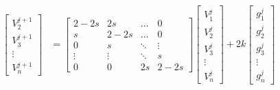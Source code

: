 \begin{align*}
\begin{bmatrix}
    V_2^{j+1} \\
    V_3^{j+1} \\
    \vdots    \\
    V_n^{j+1}
\end{bmatrix}
&=
\begin{bmatrix}
    2-2s   & 2s     & \dots  & 0 \\
    s      & 2-2s   & \dots  & 0 \\
    0      & s      & \ddots & \vdots \\
    \vdots & \vdots & \ddots & s   \\
    0      & 0      & 2s     & 2-2s
\end{bmatrix}
\begin{bmatrix}
    V_1^{j} \\
    V_2^{j} \\
    V_3^{j} \\
    \vdots  \\
    V_n^{j}
\end{bmatrix} + 2k
\begin{bmatrix}
    g_1^{j} \\
    g_2^{j} \\
    g_3^{j} \\
    \vdots  \\
    g_n^{j}
\end{bmatrix}
\end{align*}
